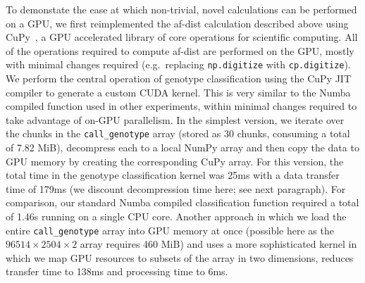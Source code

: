 \documentclass[a4paper,num-refs]{oup-contemporary}
\begin{document}
To demonstate the ease at which non-trivial, novel calculations 
can be performed on a GPU,
we first reimplemented the af-dist calculation
described above using CuPy~\citep{okuta2017cupy}, a GPU accelerated library
of core operations for scientific computing.
All of the operations required to compute  af-dist are
performed on the GPU, mostly with minimal changes required
(e.g.\ replacing \texttt{np.digitize} with \texttt{cp.digitize}).
We perform the central operation of genotype classification using the
CuPy JIT compiler to generate a custom CUDA kernel. 
This is very similar to the Numba compiled function used in other
experiments, within minimal changes required to take advantage of
on-GPU parallelism. In the simplest version, we iterate over the chunks
in the \texttt{call\_genotype} array (stored as 30 chunks, consuming
a total of 7.82 MiB), decompress each to a local
NumPy array and then copy the data to GPU memory by creating
the corresponding CuPy array. For this version, the total time
in the genotype classification kernel was 25ms with a
data transfer time of 179ms (we discount decompression
time here; see next paragraph). For comparison,
our standard Numba compiled classification function required
a total of 1.46s running on a single CPU core.
Another approach in which we load the entire
\texttt{call\_genotype} array into GPU memory at once (possible
here as the $96514 \times 2504 \times 2$ array requires
460 MiB) and uses
a more sophisticated kernel in which we map GPU resources to
subsets of the array in two dimensions,
reduces transfer time to 138ms and processing time to 6ms.
\end{document}
